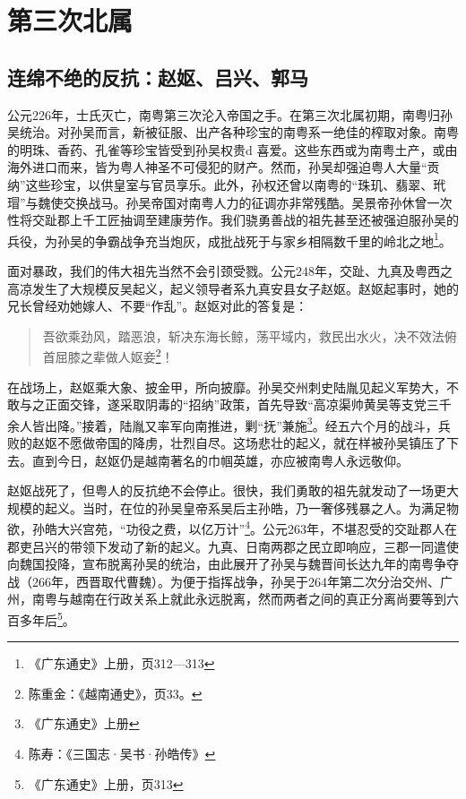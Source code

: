 \chapter{第三次北属}

\section{连绵不绝的反抗：赵妪、吕兴、郭马}

公元226年，士氏灭亡，南粤第三次沦入帝国之手。在第三次北属初期，南粤归孙吴统治。对孙吴而言，新被征服、出产各种珍宝的南粤系一绝佳的榨取对象。南粤的明珠、香药、孔雀等珍宝皆受到孙吴权贵d 喜爱。这些东西或为南粤土产，或由海外进口而来，皆为粤人神圣不可侵犯的财产。然而，孙吴却强迫粤人大量“贡纳”这些珍宝，以供皇室与官员享乐。此外，孙权还曾以南粤的“珠玑、翡翠、玳瑁”与魏使交换战马。孙吴帝国对南粤人力的征调亦非常残酷。吴景帝孙休曾一次性将交趾郡上千工匠抽调至建康劳作。我们骁勇善战的祖先甚至还被强迫服孙吴的兵役，为孙吴的争霸战争充当炮灰，成批战死于与家乡相隔数千里的岭北之地\footnote{《广东通史》上册，页312—313}。

面对暴政，我们的伟大祖先当然不会引颈受戮。公元248年，交趾、九真及粤西之高凉发生了大规模反吴起义，起义领导者系九真安县女子赵妪。赵妪起事时，她的兄长曾经劝她嫁人、不要“作乱”。赵妪对此的答复是：

\begin{quote}
	吾欲乘劲风，踏恶浪，斩决东海长鲸，荡平域内，救民出水火，决不效法俯首屈膝之辈做人妪妾\footnote{陈重金：《越南通史》，页33。}！
\end{quote}

在战场上，赵妪乘大象、披金甲，所向披靡。孙吴交州刺史陆胤见起义军势大，不敢与之正面交锋，遂采取阴毒的“招纳”政策，首先导致“高凉渠帅黄吴等支党三千余人皆出降。”接着，陆胤又率军向南推进，剿“抚”兼施\footnote{《广东通史》上册}。经五六个月的战斗，兵败的赵妪不愿做帝国的降虏，壮烈自尽。这场悲壮的起义，就在样被孙吴镇压了下去。直到今日，赵妪仍是越南著名的巾帼英雄，亦应被南粤人永远敬仰。

赵妪战死了，但粤人的反抗绝不会停止。很快，我们勇敢的祖先就发动了一场更大规模的起义。当时，在位的孙吴皇帝系吴后主孙皓，乃一奢侈残暴之人。为满足物欲，孙皓大兴宫苑，“功役之费，以亿万计”\footnote{陈寿：《三国志·吴书·孙皓传》}。公元263年，不堪忍受的交趾郡人在郡吏吕兴的带领下发动了新的起义。九真、日南两郡之民立即响应，三郡一同遣使向魏国投降，宣布脱离孙吴的统治，由此展开了孙吴与魏晋间长达九年的南粤争夺战（266年，西晋取代曹魏）。为便于指挥战争，孙吴于264年第二次分治交州、广州，南粤与越南在行政关系上就此永远脱离，然而两者之间的真正分离尚要等到六百多年后\footnote{《广东通史》上册，页313}。

